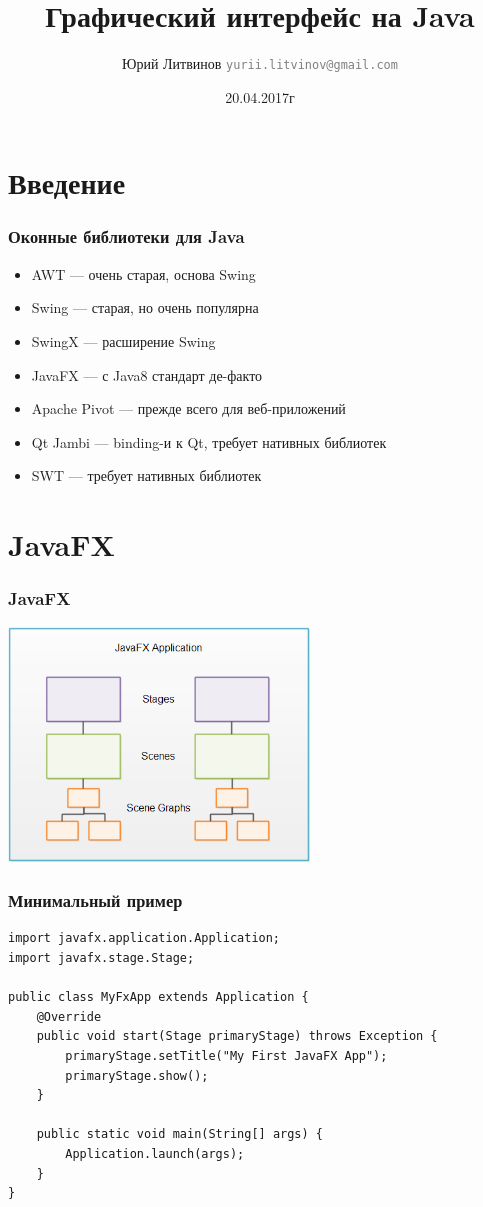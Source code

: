 \documentclass[xetex,mathserif,serif]{beamer}
\title{Графический интерфейс на Java}
\author[Юрий Литвинов]{Юрий Литвинов \newline \textcolor{gray}{\small\texttt{yurii.litvinov@gmail.com}}}
\date{20.04.2017г}
\begin{document}
	
	\frame{\titlepage}
	
	\section{Введение}

	\begin{frame}
		\frametitle{Оконные библиотеки для Java}
		\begin{itemize}
			\item AWT --- очень старая, основа Swing
			\item Swing --- старая, но очень популярна
			\item SwingX --- расширение Swing
			\item JavaFX --- с Java8 стандарт де-факто
			\item Apache Pivot --- прежде всего для веб-приложений
			\item Qt Jambi --- binding-и к Qt, требует нативных библиотек
			\item SWT --- требует нативных библиотек
		\end{itemize}
	\end{frame}

	\section{JavaFX}

	\begin{frame}
		\frametitle{JavaFX}
		\begin{center}
			\includegraphics[width=0.6\textwidth]{javaFxOverview.png}
		\end{center}
	\end{frame}

	\begin{frame}[fragile]
		\frametitle{Минимальный пример}
		\begin{verbatim}
import javafx.application.Application;
import javafx.stage.Stage;

public class MyFxApp extends Application {
    @Override
    public void start(Stage primaryStage) throws Exception {
        primaryStage.setTitle("My First JavaFX App");
        primaryStage.show();
    }
    
    public static void main(String[] args) {
        Application.launch(args);
    }
}
		\end{verbatim}
\end{frame}
\end{document}
